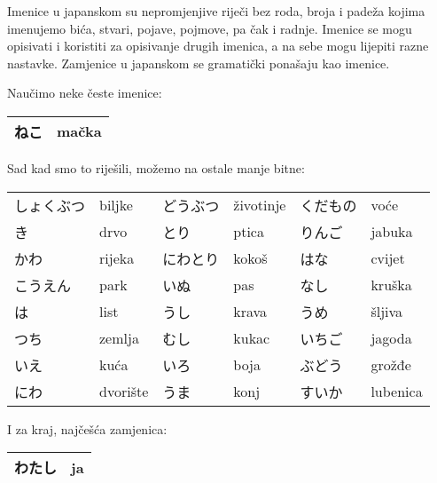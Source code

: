 
\author{Tomislav Mamić, Željka Ludošan}


	
	
	Imenice u japanskom su nepromjenjive riječi bez roda, broja i padeža kojima imenujemo bića, stvari, pojave, pojmove, pa čak i radnje. Imenice se mogu opisivati i koristiti za opisivanje drugih imenica, a na sebe mogu lijepiti razne nastavke. Zamjenice u japanskom se gramatički ponašaju kao imenice.

Naučimo neke česte imenice:
\vspace{10pt}

	\begin{tabular}{|l|l|}
		\hline
		ねこ&mačka\\\hline
	\end{tabular}
	\vspace{10pt}
	
	Sad kad smo to riješili, možemo na ostale manje bitne:
	
	\vspace{10pt}
	\begin{tabular}{l l l l l l}
		\toprule[2pt]
		しょくぶつ&biljke&どうぶつ&životinje&くだもの&voće\\
		き&drvo&とり&ptica&りんご&jabuka\\
		かわ&rijeka&にわとり&kokoš&はな&cvijet\\
		こうえん&park&いぬ&pas&なし&kruška\\
		は&list&うし&krava&うめ&šljiva\\
		つち&zemlja&むし&kukac&いちご&jagoda\\
		いえ&kuća&いろ&boja&ぶどう&grožđe\\
		にわ&dvorište&うま&konj&すいか&lubenica\\
		\bottomrule[2pt]
	\end{tabular}

	
	\vspace{10pt}
	I za kraj, najčešća zamjenica:
	
	\vspace{10pt}
	\begin{tabular}{|l|l|}
		\hline
		わたし&ja\\\hline
	\end{tabular}
	\vspace{10pt}

